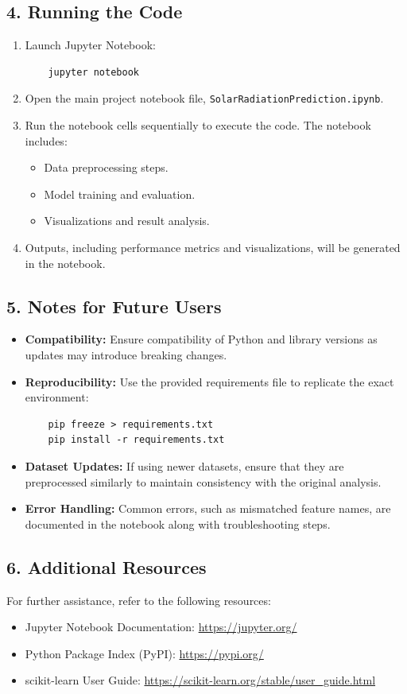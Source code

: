 \documentclass[10pt,twocolumn]{article}
\begin{document}
\begin{itemize}
\subsection*{4. Running the Code}
\begin{enumerate}
    \item Launch Jupyter Notebook:
    \begin{verbatim}
    jupyter notebook
    \end{verbatim}
    \item Open the main project notebook file, \texttt{SolarRadiationPrediction.ipynb}.
    \item Run the notebook cells sequentially to execute the code. The notebook includes:
    \begin{itemize}
        \item Data preprocessing steps.
        \item Model training and evaluation.
        \item Visualizations and result analysis.
    \end{itemize}
    \item Outputs, including performance metrics and visualizations, will be generated in the notebook.
\end{enumerate}

\subsection*{5. Notes for Future Users}
\begin{itemize}
    \item \textbf{Compatibility:} Ensure compatibility of Python and library versions as updates may introduce breaking changes.
    \item \textbf{Reproducibility:} Use the provided requirements file to replicate the exact environment:
    \begin{verbatim}
    pip freeze > requirements.txt
    pip install -r requirements.txt
    \end{verbatim}
    \item \textbf{Dataset Updates:} If using newer datasets, ensure that they are preprocessed similarly to maintain consistency with the original analysis.
    \item \textbf{Error Handling:} Common errors, such as mismatched feature names, are documented in the notebook along with troubleshooting steps.
\end{itemize}

\subsection*{6. Additional Resources}
For further assistance, refer to the following resources:
\begin{itemize}
    \item Jupyter Notebook Documentation: \url{https://jupyter.org/}
    \item Python Package Index (PyPI): \url{https://pypi.org/}
    \item scikit-learn User Guide: \url{https://scikit-learn.org/stable/user_guide.html}
\end{itemize}


\end{itemize}
\end{document}
